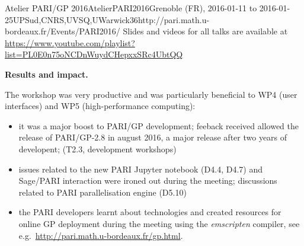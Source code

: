 \begin{event}{Atelier PARI/GP 2016}{AtelierPARI2016}{Grenoble (FR),
2016-01-11 to 2016-01-25}{UPSud,CNRS,UVSQ,UWarwick}{36}{http://pari.math.u-bordeaux.fr/Events/PARI2016/}
Slides and videos for all talks are available at
\url{https://www.youtube.com/playlist?list=PL0E0n75oNCDnWuydCHepxxSRc4UbtQQ}

\textbf{Results and impact.} 

The workshop was very productive and was particularly beneficial to WP4 (user
interfaces) and WP5 (high-performance computing):
\begin{itemize}
\item it was a major boost to PARI/GP development; feeback received allowed
the release of PARI/GP-2.8 in august 2016, a major release after two years of
developent; (T2.3, development workshops)

\item issues related to the new PARI Jupyter notebook (D4.4, D4.7) and
Sage/PARI interaction were ironed out during the meeting; discussions related
to PARI parallelisation engine (D5.10)

\item the PARI developers learnt about technologies and created resources for
online GP deployment during the meeting using the \emph{emscripten} compiler,
see e.g.~\url{http://pari.math.u-bordeaux.fr/gp.html}.
\end{itemize}

\end{event}
